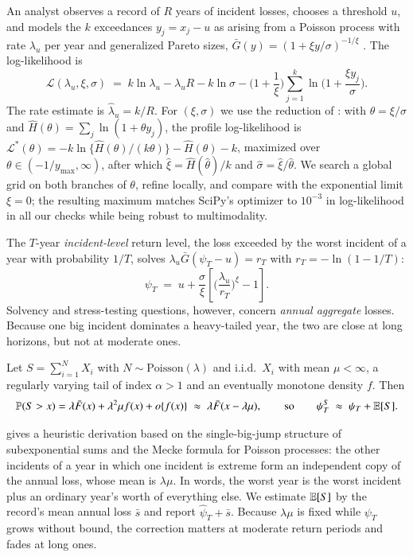 An analyst observes a record of $R$ years of incident losses, chooses a threshold $u$, and models the $k$ exceedances $y_j = x_j - u$ as arising from a Poisson process with rate $\lambda_u$ per year and generalized Pareto sizes, $\bar G(y) = (1+\xi y/\sigma)^{-1/\xi}$ \citep{balkema1974,pickands1975,davison1990}. The log-likelihood is
\begin{equation}\label{eq:loglik}
\mathcal{L}(\lambda_u,\xi,\sigma) \;=\; k\ln\lambda_u - \lambda_u R - k\ln\sigma - \Big(1+\frac{1}{\xi}\Big)\sum_{j=1}^{k}\ln\!\Big(1+\frac{\xi y_j}{\sigma}\Big).
\end{equation}
The rate estimate is $\hat\lambda_u = k/R$. For $(\xi,\sigma)$ we use the reduction of \citet{grimshaw1993}: with $\theta = \xi/\sigma$ and $\hat H(\theta) = \sum_j \ln(1+\theta y_j)$, the profile log-likelihood is $\mathcal{L}^\ast(\theta) = -k\ln\{\hat H(\theta)/(k\theta)\} - \hat H(\theta) - k$, maximized over $\theta \in (-1/y_{\max},\infty)$, after which $\hat\xi = \hat H(\hat\theta)/k$ and $\hat\sigma = \hat\xi/\hat\theta$. We search a global grid on both branches of $\theta$, refine locally, and compare with the exponential limit $\xi = 0$; the resulting maximum matches SciPy's optimizer to $10^{-3}$ in log-likelihood in all our checks while being robust to multimodality.

The $T$-year \emph{incident-level} return level, the loss exceeded by the worst incident of a year with probability $1/T$, solves $\lambda_u \bar G(\psi_T - u) = r_T$ with $r_T = -\ln(1-1/T)$:
\begin{equation}\label{eq:rl}
\psi_T \;=\; u + \frac{\sigma}{\xi}\left[\Big(\frac{\lambda_u}{r_T}\Big)^{\xi} - 1\right].
\end{equation}
Solvency and stress-testing questions, however, concern \emph{annual aggregate} losses. Because one big incident dominates a heavy-tailed year, the two are close at long horizons, but not at moderate ones.

\begin{approximation}\label{app:shift}
Let $S = \sum_{i=1}^{N} X_i$ with $N\sim\mathrm{Poisson}(\lambda)$ and i.i.d.\ $X_i$ with mean $\mu<\infty$, a regularly varying tail of index $\alpha > 1$ and an eventually monotone density $f$. Then
\begin{equation}\label{eq:shift}
\mathbb{P}(S > x) = \lambda \bar F(x) + \lambda^2 \mu f(x) + o\{f(x)\} \;\approx\; \lambda \bar F(x - \lambda\mu),
\qquad\text{so}\qquad \psi^{S}_{T} \;\approx\; \psi_T + \mathbb{E}[S].
\end{equation}
\end{approximation}
\noindent {} gives a heuristic derivation based on the single-big-jump structure of subexponential sums and the Mecke formula for Poisson processes: the other incidents of a year in which one incident is extreme form an independent copy of the annual loss, whose mean is $\lambda\mu$. In words, the worst year is the worst incident plus an ordinary year's worth of everything else. We estimate $\mathbb{E}[S]$ by the record's mean annual loss $\bar s$ and report $\hat\psi_T + \bar s$. Because $\lambda\mu$ is fixed while $\psi_T$ grows without bound, the correction matters at moderate return periods and fades at long ones.

